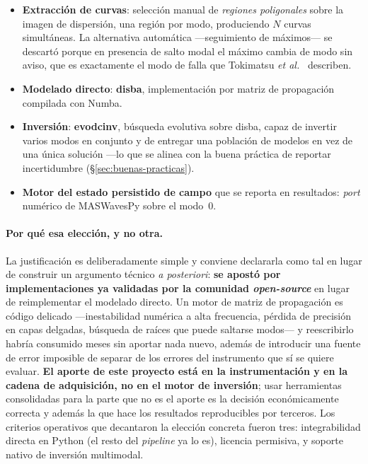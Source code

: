 \begin{itemize}[itemsep=0.15em]
    \item \textbf{Extracci\'on de curvas}: selecci\'on manual de \emph{regiones
    poligonales} sobre la imagen de dispersi\'on, una regi\'on por modo, produciendo $N$
    curvas simult\'aneas. La alternativa autom\'atica ---seguimiento de m\'aximos--- se
    descart\'o porque en presencia de salto modal el m\'aximo cambia de modo sin aviso, que
    es exactamente el modo de falla que Tokimatsu \emph{et al.}~\cite{Tokimatsu1992}
    describen.
    \item \textbf{Modelado directo}: \textbf{disba}, implementaci\'on por matriz de
    propagaci\'on compilada con Numba.
    \item \textbf{Inversi\'on}: \textbf{evodcinv}, b\'usqueda evolutiva sobre disba, capaz
    de invertir varios modos en conjunto y de entregar una poblaci\'on de modelos en vez de
    una \'unica soluci\'on ---lo que se alinea con la buena pr\'actica de reportar
    incertidumbre (\S\ref{sec:buenas-practicas}).
    \item \textbf{Motor del estado persistido de campo} que se reporta en resultados:
    \emph{port} num\'erico de MASWavesPy sobre el modo~0.
\end{itemize}

\paragraph{Por qu\'e esa elecci\'on, y no otra.} La justificaci\'on es deliberadamente
simple y conviene declararla como tal en lugar de construir un argumento t\'ecnico
\emph{a posteriori}: \textbf{se apost\'o por implementaciones ya validadas por la
comunidad \emph{open-source}} en lugar de reimplementar el modelado directo. Un motor de
matriz de propagaci\'on es c\'odigo delicado ---inestabilidad num\'erica a alta frecuencia,
p\'erdida de precisi\'on en capas delgadas, b\'usqueda de ra\'ices que puede saltarse
modos--- y reescribirlo habr\'ia consumido meses sin aportar nada nuevo, adem\'as de
introducir una fuente de error imposible de separar de los errores del instrumento que
s\'i se quiere evaluar. \textbf{El aporte de este proyecto est\'a en la instrumentaci\'on y
en la cadena de adquisici\'on, no en el motor de inversi\'on}; usar herramientas
consolidadas para la parte que no es el aporte es la decisi\'on econ\'omicamente correcta
y adem\'as la que hace los resultados reproducibles por terceros. Los criterios
operativos que decantaron la elecci\'on concreta fueron tres: integrabilidad directa en
Python (el resto del \emph{pipeline} ya lo es), licencia permisiva, y soporte nativo de
inversi\'on multimodal.

